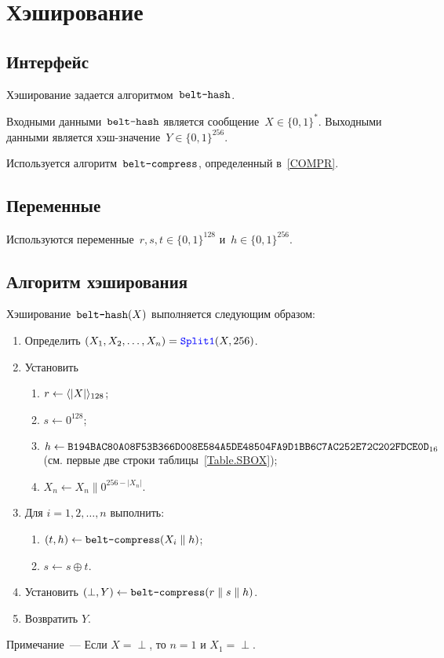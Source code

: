\section{Хэширование}\label{HASH}

\subsection{Интерфейс}\label{HASH.IFace}

Хэширование задается алгоритмом~$\texttt{belt-hash}$.

Входными данными~$\texttt{belt-hash}$ является сообщение~$X\in\{0,1\}^*$.
%
Выходными данными является хэш-значение~$Y\in\{0,1\}^{256}$.

Используется алгоритм~$\texttt{belt-compress}$, определенный в~\ref{COMPR}.

\subsection{Переменные}\label{HASH.Vars}

Используются переменные~$r,s,t\in\{0,1\}^{128}$ и~$h\in\{0,1\}^{256}$.

\subsection{Алгоритм хэширования}\label{HASH.Alg}

Хэширование~$\texttt{belt-hash}(X)$ выполняется следующим образом:
\begin{enumerate}
\item
Определить $(X_1,X_2,\ldots,X_n)=\mathop{\textcolor{blue}{\texttt{Split1}}}\nolimits(X, 256)$.

\item
Установить
\begin{enumerate}
\item
$r\leftarrow \langle|X|\rangle_{128}$;
\item
$s\leftarrow 0^{128}$;
\item
$h\leftarrow\texttt{B194BAC80A08F53B366D008E584A5DE48504FA9D1BB6C7AC252E72C202FDCE0D}_{16}$ 
(см. первые две строки таблицы~\ref{Table.SBOX});
\item
$X_n\leftarrow X_n \parallel 0^{256-|X_n|}$.
\end{enumerate}

\item
Для $i=1,2,\ldots,n$ выполнить:
\begin{enumerate}
\item
$(t,h)\leftarrow\texttt{belt-compress}(X_i\parallel h)$;
\item
$s\leftarrow s\oplus t$.
\end{enumerate}

\item
Установить 
$(\perp,Y)\leftarrow\texttt{belt-compress}(r\parallel s\parallel h)$.

\item
Возвратить $Y$.
\end{enumerate}

\vskip9pt
\begin{note}
Примечание~--- Если $X=\perp$, то $n=1$ и $X_1=\perp$.
\end{note}
